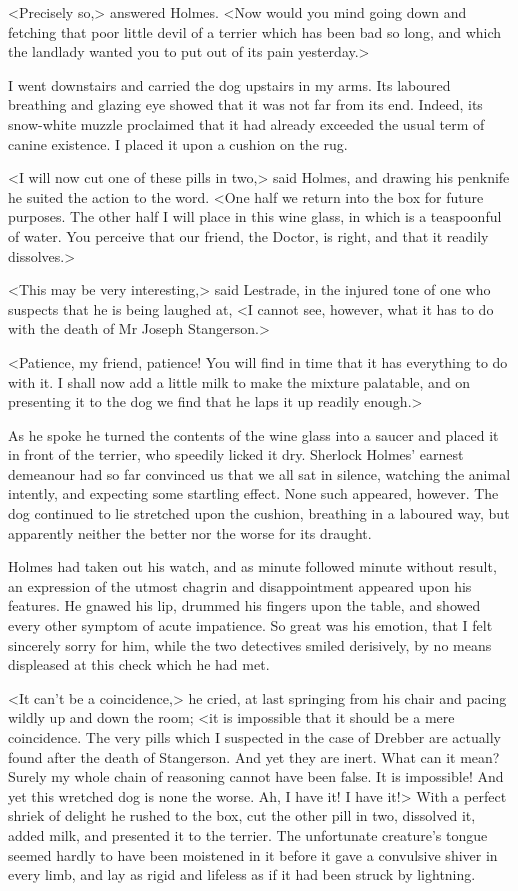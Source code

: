 <Precisely so,> answered Holmes. <Now would you mind going down and fetching that poor little devil of a terrier which has been bad so long, and which the landlady wanted you to put out of its pain yesterday.>

I went downstairs and carried the dog upstairs in my arms. Its laboured breathing and glazing eye showed that it was not far from its end. Indeed, its snow-white muzzle proclaimed that it had already exceeded the usual term of canine existence. I placed it upon a cushion on the rug.

<I will now cut one of these pills in two,> said Holmes, and drawing his penknife he suited the action to the word. <One half we return into the box for future purposes. The other half I will place in this wine glass, in which is a teaspoonful of water. You perceive that our friend, the Doctor, is right, and that it readily dissolves.>

<This may be very interesting,> said Lestrade, in the injured tone of one who suspects that he is being laughed at, <I cannot see, however, what it has to do with the death of Mr Joseph Stangerson.>

<Patience, my friend, patience! You will find in time that it has everything to do with it. I shall now add a little milk to make the mixture palatable, and on presenting it to the dog we find that he laps it up readily enough.>

As he spoke he turned the contents of the wine glass into a saucer and placed it in front of the terrier, who speedily licked it dry. Sherlock Holmes' earnest demeanour had so far convinced us that we all sat in silence, watching the animal intently, and expecting some startling effect. None such appeared, however. The dog continued to lie stretched upon the cushion, breathing in a laboured way, but apparently neither the better nor the worse for its draught.

Holmes had taken out his watch, and as minute followed minute without result, an expression of the utmost chagrin and disappointment appeared upon his features. He gnawed his lip, drummed his fingers upon the table, and showed every other symptom of acute impatience. So great was his emotion, that I felt sincerely sorry for him, while the two detectives smiled derisively, by no means displeased at this check which he had met.

<It can't be a coincidence,> he cried, at last springing from his chair and pacing wildly up and down the room; <it is impossible that it should be a mere coincidence. The very pills which I suspected in the case of Drebber are actually found after the death of Stangerson. And yet they are inert. What can it mean? Surely my whole chain of reasoning cannot have been false. It is impossible! And yet this wretched dog is none the worse. Ah, I have it! I have it!> With a perfect shriek of delight he rushed to the box, cut the other pill in two, dissolved it, added milk, and presented it to the terrier. The unfortunate creature's tongue seemed hardly to have been moistened in it before it gave a convulsive shiver in every limb, and lay as rigid and lifeless as if it had been struck by lightning.

